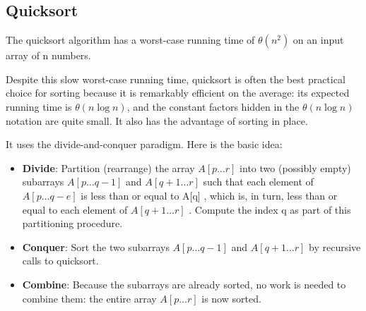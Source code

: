 \newpage

\subsection{Quicksort}


\begin{minipage}[H]{0.72\textwidth}

    The quicksort algorithm has a worst-case running time of $\theta (n^2)$ on an input array of n numbers. 

    \vspace{0.5em}

    Despite this slow worst-case running time, quicksort is often the best practical choice for sorting because it is remarkably efficient on the average: its expected running time is $\theta (n\log n)$, and the constant factors hidden in the $\theta (n\log n)$ notation are quite small. It also has the advantage of sorting in place.

    \vspace{0.5em}

    It uses the divide-and-conquer paradigm. Here is the basic idea:

    \vspace{0.5em}

    \begin{itemize}
        \item \textbf{Divide}: Partition (rearrange) the array $A[p\dots r]$ into two (possibly empty) subarrays $A[p\dots q-1]$ and $A[q+1\dots r]$ such that each element of $A[p\dots q-e]$ is less than or equal to A[q] , which is, in turn, less than or equal to each element of $A[q+1\dots r]$ . Compute the index q as part of this partitioning procedure.
        \item \textbf{Conquer}: Sort the two subarrays $A[p\dots q-1]$ and $A[q+1\dots r]$ by recursive calls to quicksort.
        \item \textbf{Combine}: Because the subarrays are already sorted, no work is needed to combine them: the entire array $A[p\dots r]$ is now sorted.
    \end{itemize}
\end{minipage}%
